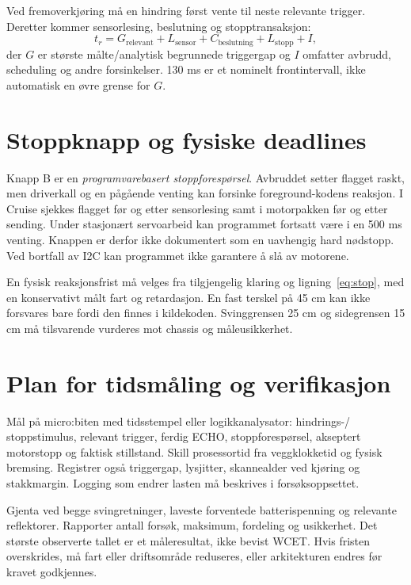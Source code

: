 Ved fremoverkjøring må en hindring først vente til neste relevante trigger.
Deretter kommer sensorlesing, beslutning og stopptransaksjon:
\begin{equation}
 t_r=G_{\mathrm{relevant}}+L_{\mathrm{sensor}}+
 C_{\mathrm{beslutning}}+L_{\mathrm{stopp}}+I,
\end{equation}
der $G$ er største målte/analytisk begrunnede triggergap og $I$ omfatter
avbrudd, scheduling og andre forsinkelser. 130 ms er et nominelt
frontintervall, ikke automatisk en øvre grense for $G$.

\section{Stoppknapp og fysiske deadlines}
Knapp B er en \emph{programvarebasert stoppforespørsel}. Avbruddet setter
flagget raskt, men driverkall og en pågående venting kan forsinke
foreground-kodens reaksjon. I Cruise sjekkes flagget før og etter
sensorlesing samt i motorpakken før og etter sending. Under stasjonært
servoarbeid kan programmet fortsatt være i en 500 ms venting.
Knappen er derfor ikke dokumentert som en uavhengig hard nødstopp.
Ved bortfall av I2C kan programmet ikke garantere å slå av motorene.

En fysisk reaksjonsfrist må velges fra tilgjengelig klaring og
ligning~\ref{eq:stop}, med en konservativt målt fart og retardasjon.
 En fast terskel på 45 cm kan
ikke forsvares bare fordi den finnes i kildekoden. Svinggrensen 25 cm og
sidegrensen 15 cm må tilsvarende vurderes mot chassis og måleusikkerhet.

\section{Plan for tidsmåling og verifikasjon}
Mål på micro:biten med tidsstempel eller logikkanalysator: hindrings-/
stoppstimulus, relevant trigger, ferdig ECHO, stoppforespørsel,
akseptert motorstopp og faktisk stillstand. Skill prosessortid fra
veggklokketid og fysisk bremsing. Registrer også triggergap, lysjitter,
skannealder ved kjøring og stakkmargin. Logging som endrer lasten må
beskrives i forsøksoppsettet.

Gjenta ved begge svingretninger, laveste forventede batterispenning og
relevante reflektorer. Rapporter antall forsøk, maksimum, fordeling og
usikkerhet. Det største observerte tallet er et måleresultat, ikke bevist
WCET. Hvis fristen overskrides, må fart eller driftsområde reduseres,
eller arkitekturen endres før kravet godkjennes.
